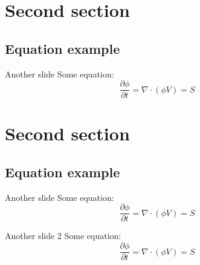 \documentclass[compress, aspectratio=169]{beamer}
\begin{document}
\section{Second section}
\subsection{Equation example}
\begin{frame}{Another slide}
  Some equation:
  \begin{equation*}
    \frac{\partial\phi}{\partial t} = \nabla \cdot \left(\phi V\right) = S
    \label{eq:1}
  \end{equation*}

  
\end{frame}


\section{Second section}
\subsection{Equation example}
\begin{frame}[noframenumbering]{Another slide}
  Some equation:
  \begin{equation*}
    \frac{\partial\phi}{\partial t} = \nabla \cdot \left(\phi V\right) = S
    \label{eq:1}
  \end{equation*}

  
\end{frame}

\begin{frame}[noframenumbering]{Another slide 2}
  Some equation:
  \begin{equation*}
    \frac{\partial\phi}{\partial t} = \nabla \cdot \left(\phi V\right) = S
    \label{eq:1}
  \end{equation*}

  
\end{frame}
\end{document}
